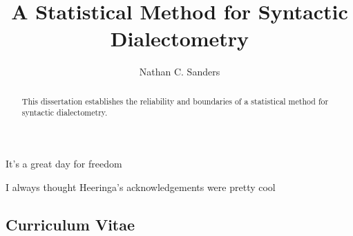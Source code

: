 \documentclass{iuthesis}
\title{A Statistical Method for Syntactic Dialectometry}
\author{Nathan C. Sanders}
\begin{document}
\begin{dedication}
  It's a great day for freedom
\end{dedication}
\begin{acknowledgements}
  I always thought Heeringa's acknowledgements were
  pretty cool
\end{acknowledgements}
\begin{abstract}
  This dissertation establishes the reliability and boundaries of a
  statistical method for syntactic dialectometry.
\end{abstract}

\frontmatter
\maketitle
\signaturepage
\copyrightpage
\makededication
\makeack
\makeabstract
\tableofcontents
\mainmatter











\backmatter

\begin{center}
\section*{Curriculum Vitae}
\end{center}
\end{document}
